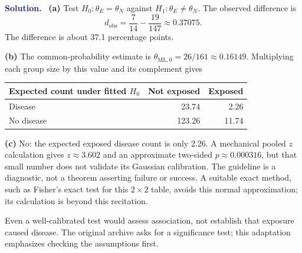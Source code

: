 \documentclass[11pt]{article}
\newif\ifsolutions
\newenvironment{answer}{\par\medskip\noindent\textcolor{MidnightBlue}{\textbf{Solution.}}\ }{\par\medskip}
\begin{document}
\begin{answer}
\textbf{(a)} Test $H_0:\theta_E=\theta_N$ against
$H_1:\theta_E\ne\theta_N$. The observed difference is
\[
 \boxed{d_{\mathrm{obs}}=\frac7{14}-\frac{19}{147}\approx0.37075.}
\]
The difference is about 37.1 percentage points.

\textbf{(b)} The common-probability estimate is
$\theta_{\mathrm{ML},0}=26/161\approx0.16149$.
Multiplying each group size by this value and its complement gives
\begin{center}
\begin{tabular}{@{}lrr@{}}
\toprule Expected count under fitted $H_0$ & Not exposed & Exposed\\\midrule
Disease & 23.74 & 2.26\\
No disease & 123.26 & 11.74\\\bottomrule
\end{tabular}
\end{center}
\textbf{(c)} No: the expected exposed disease count is only 2.26.
A mechanical pooled $z$ calculation gives $z\approx3.602$ and an approximate
two-sided $p\approx0.000316$, but that small number does not validate its
Gaussian calibration. The guideline is a diagnostic, not a theorem
asserting failure or success. A suitable exact method, such as Fisher's
exact test for this $2\times2$ table, avoids this normal approximation;
its calculation is beyond this recitation.

Even a well-calibrated test would assess association, not establish that
exposure caused disease. The original archive asks for a significance
test; this adaptation emphasizes checking the assumptions first.
\end{answer}

\ifsolutions
\newpage
\end{document}
